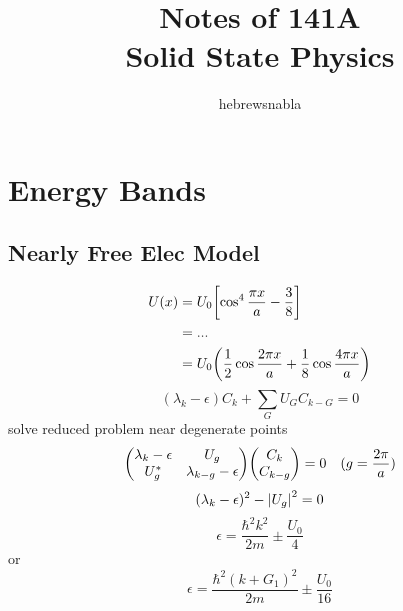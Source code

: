 \documentclass[UTF8]{ctexart} %
\title{Notes of 141A\\
Solid State Physics}
\author{hebrewsnabla}
\numberwithin{equation}{section}
\begin{document}
\maketitle

\tableofcontents

\newpage

\setcounter{section}{6}
\section{Energy Bands}
\subsection{Nearly Free Elec Model}
\begin{equation}\label{key}
\begin{aligned}
U(x) &= U_0 \qty[\cos^4\dfrac{\pi x}{a} - \dfrac{3}{8}]\\
&= ...\\
&= U_0 \qty(\dfrac{1}{2}\cos\dfrac{2\pi x}{a} + \dfrac{1}{8}\cos\dfrac{4\pi x}{a})
\end{aligned}
\end{equation}
\begin{equation}\label{key}
(\lambda_k - \epsilon)C_k + \sum_G U_G C_{k-G} = 0
\end{equation}
solve reduced problem near degenerate points
\begin{equation}\label{key}
\mqty(\lambda_k - \epsilon & U_g\\
      U_g^\ast & \lambda_{k-g} - \epsilon)
\mqty(C_k \\ C_{k-g}) = 0  \quad (g = \dfrac{2\pi}{a})
\end{equation}
\begin{equation}\label{key}
(\lambda_k - \epsilon)^2 - \abs{U_g}^2 = 0
\end{equation}
\begin{equation}\label{key}
\epsilon = \dfrac{\hbar^2 k^2}{2m} \pm \dfrac{U_0}{4}
\end{equation}
or
\begin{equation}\label{key}
\epsilon = \dfrac{\hbar^2 (k+G_1)^2}{2m} \pm \dfrac{U_0}{16}
\end{equation}
\end{document}
